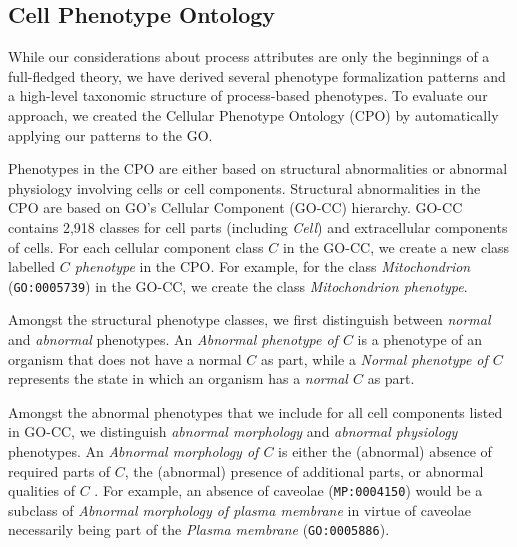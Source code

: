 \documentclass{bioinfo}
\renewcommand{\cite}{\citep}
\begin{document}




\subsection{Cell Phenotype Ontology}
While our considerations about process attributes are only the
beginnings of a full-fledged theory, we have derived several phenotype
formalization patterns and a high-level taxonomic structure of
process-based phenotypes. To evaluate our approach, we created the
Cellular Phenotype Ontology (CPO) by automatically applying our
patterns to the GO.

Phenotypes in the CPO are either based on structural abnormalities or
abnormal physiology involving cells or cell components. Structural
abnormalities in the CPO are based on GO's Cellular Component (GO-CC)
hierarchy. GO-CC contains 2,918 classes for cell parts (including {\em
  Cell}) and extracellular components of cells. For each cellular
component class $C$ in the GO-CC, we create a new class labelled {\em
  $C$ phenotype} in the CPO. For example, for the class {\em
  Mitochondrion} ({\tt GO:0005739}) in the GO-CC, we create the class
{\em Mitochondrion phenotype}.

Amongst the structural phenotype classes, we first distinguish between
{\em normal} and {\em abnormal} phenotypes. An {\em Abnormal phenotype
  of $C$} is a phenotype of an organism that does not have a normal
$C$ as part, while a {\em Normal phenotype of $C$} represents the
state in which an organism has a {\em normal $C$} as part.

Amongst the abnormal phenotypes that we include for all cell
components listed in GO-CC, we distinguish {\em abnormal morphology}
and {\em abnormal physiology} phenotypes. An {\em Abnormal morphology
  of $C$} is either the (abnormal) absence of required parts of $C$,
the (abnormal) presence of additional parts, or abnormal qualities of
$C$ \cite{Hoehndorf2010phene}. For example, an absence of caveolae
({\tt MP:0004150}) would be a subclass of {\em Abnormal morphology of
  plasma membrane} in virtue of caveolae necessarily being part of the
{\em Plasma membrane} ({\tt GO:0005886}).
\end{document}
